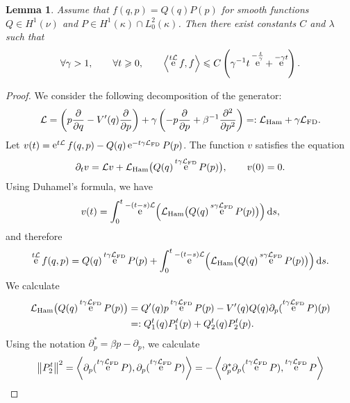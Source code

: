 \documentclass[11pt,a4paper]{article}
\DeclareMathOperator{\e}{e}
\renewcommand{\d}{\mathrm d}
\theoremstyle{plain}
\newtheorem{lemma}{Lemma}[section]
\numberwithin{equation}{section}
\renewcommand{\leq}{\leqslant}
\renewcommand{\geq}{\geqslant}
\begin{document}
\begin{lemma}
    Assume that $f(q, p) = Q(q) P(p)$ for smooth functions $Q \in H^1(\nu)$ and $P \in H^1(\kappa) \cap L^2_0(\kappa)$.
    Then there exist constants $C$ and $\lambda$ such that
    \[
        \forall \gamma > 1, \qquad
        \forall t \geq 0, \qquad
        \ip{\e^{t \mathcal L}f}{f} \leq C \left( \gamma^{-1} t \e^{- \frac{t}{\gamma}} + \e^{-\gamma t} \right).
    \]
\end{lemma}
\begin{proof}
    We consider the following decomposition of the generator:
    \[
        \mathcal L
        = \left( p \derivative{1}{q} - \derivative*{1}[V]{q}(q) \derivative{1}{p} \right)
        + \gamma \left( - p \derivative{1}{p} + \beta^{-1} \derivative{2}{p^2} \right)
        =: \mathcal L_{\rm Ham} + \gamma \mathcal L_{\rm FD}.
    \]
    Let $v(t) = \e^{t \mathcal L} f(q, p) - Q(q) \e^{- t \gamma \mathcal L_{\rm FD}} P(p)$.
    The function $v$ satisfies the equation
    \[
        \partial_t v = \mathcal L v +  \mathcal L_{\rm Ham} \bigl(Q(q) \e^{t \gamma \mathcal L_{\rm FD}} P(p)\bigr), \qquad v(0) = 0.
    \]
    Using Duhamel's formula, we have
    \[
        v(t) = \int_{0}^{t} \e^{- (t-s) \mathcal L}  \Bigl( \mathcal L_{\rm Ham} \bigl(Q(q) \e^{s \gamma \mathcal L_{\rm FD}} P(p)\bigr) \Bigr) \, \d s,
    \]
    and therefore
    \begin{equation}
        \label{eq:intermediate_decay_correlation}
        \e^{t \mathcal L} f(q,p) = Q(q) \e^{t \gamma \mathcal L_{\rm FD}} P(p)
        + \int_{0}^{t} \e^{- (t-s) \mathcal L}  \Bigl( \mathcal L_{\rm Ham} \bigl(Q(q) \e^{s \gamma \mathcal L_{\rm FD}} P(p)\bigr) \Bigr) \, \d s.
    \end{equation}
    We calculate
    \begin{align*}
        \mathcal L_{\rm Ham} \bigl(Q(q) \e^{t \gamma \mathcal L_{\rm FD}} P(p)\bigr)
        &= Q'(q) p \e^{t \gamma \mathcal L_{\rm FD}} P(p) - V'(q) Q(q) \partial_p(\e^{t \gamma \mathcal L_{\rm FD}} P) (p) \\
        &=: Q^t_1(q) P^t_1(p) + Q^t_2(q) P^t_2(p).
    \end{align*}
    Using the notation $\partial_p^* = \beta p - \partial_p$,
    we calculate
    \begin{align*}
        \norm{P^t_2}^2
        &= \ip{\partial_p (\e^{t \gamma \mathcal L_{\rm FD}} P)}{\partial_p (\e^{t \gamma \mathcal L_{\rm FD}} P)}
        = - \ip{\partial_p^* \partial_p (\e^{t \gamma \mathcal L_{\rm FD}} P)}{\e^{t \gamma \mathcal L_{\rm FD}} P} \\

\end{align*}
\end{proof}
\end{document}
